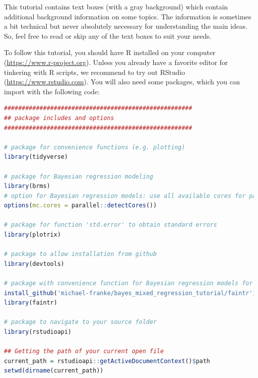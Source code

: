 \documentclass[nobib]{tufte-handout}
\begin{document}
This tutorial contains text boxes (with a gray background) which contain additional background information on some topics.
The information is sometimes a bit technical but never absolutely necessary for understanding the main ideas.
So, feel free to read or skip any of the text boxes to suit your needs.

To follow this tutorial, you should have R installed on your computer (\url{https://www.r-project.org}).
Unless you already have a favorite editor for tinkering with R scripts, we recommend to try out RStudio (\url{https://www.rstudio.com}).
You will also need some packages,
which you can import with the following code:

\begin{minipage}[]{\textwidth}
\begin{lstlisting}[language=R]
#####################################################
## package includes and options
#####################################################

# package for convenience functions (e.g. plotting)
library(tidyverse)

# package for Bayesian regression modeling
library(brms)
# option for Bayesian regression models: use all available cores for parallel computing
options(mc.cores = parallel::detectCores())

# package for function 'std.error' to obtain standard errors
library(plotrix)

# package to allow installation from github
library(devtools)

# package with convenience function for Bayesian regression models for factorial designs
install_github('michael-franke/bayes_mixed_regression_tutorial/faintr') # install from GitHub
library(faintr)

# package to navigate to your source folder
library(rstudioapi)

## Getting the path of your current open file
current_path = rstudioapi::getActiveDocumentContext()$path 
setwd(dirname(current_path))
\end{lstlisting}
\end{minipage}
\end{document}
